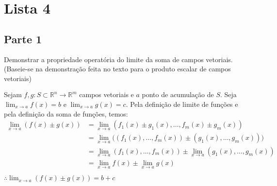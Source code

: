 \documentclass[../main.tex]{subfiles}
\begin{document}
	
	\section{Lista 4}
		\subsection{Parte 1}
		
		\begin{exercicio}{3}
			Demonstrar a propriedade operatória do limite da soma de campos vetoriais. (Baseie-se na demonstração feita no texto para o produto escalar de campos vetoriais)
		\end{exercicio}
		\begin{solucao}
			Sejam $f,g\colon S\subset \mathbb{R}^n \rightarrow \mathbb{R}^m$ campos vetoriais e $a$ ponto de acumulação de $S$. Seja $\lim_{x \to a} f(x)=b$ e $\lim_{x \to a} g(x)=c$. Pela definição de limite de funções e pela definição da soma de funções, temos:
			\begin{align*}
				\lim_{x \to a} (f(x) \pm g(x))
					&= \lim_{x \to a} (f_1(x)\pm g_1(x),\dots, f_m(x)\pm g_m(x)) \\
					&= \lim_{x \to a} \bigg((f_1(x),\dots,f_m(x))\pm (g_1(x),\dots, g_m(x))\bigg)\\
					&= \lim_{x \to a} (f_1(x),\dots,f_m(x))\pm \lim_{x \to a} (g_1(x),\dots, g_m(x)) \\
					&= \lim_{x \to a} f(x) \pm \lim_{x\to a} g(x) \\
			\end{align*}
			$\therefore \lim_{x \to a} (f(x) \pm g(x)) = b+c$
		\end{solucao}
		
\end{document}
